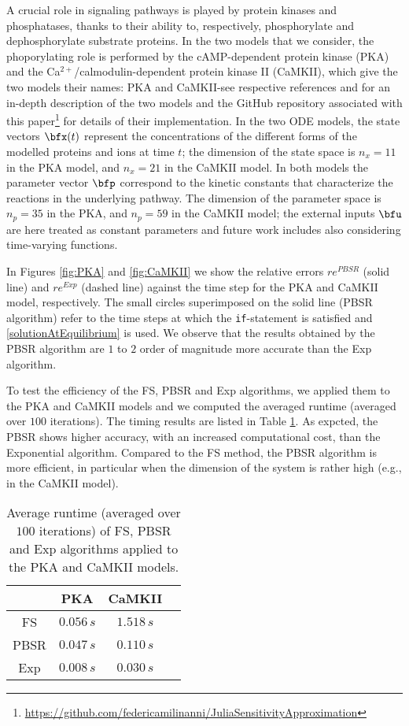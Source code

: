 \documentclass[DIV=12]{scrartcl} %
\newcommand{\rerr}{\ensuremath{re}}
\theoremstyle{definition}
\begin{document}
A crucial role in signaling pathways is played by protein kinases and phosphatases, thanks to their ability to, respectively, phosphorylate and dephosphorylate substrate proteins. In the two models that we consider, the phoporylating role is performed by the cAMP-dependent protein kinase (PKA) and the Ca$^{2+}$/calmodulin-dependent protein kinase II (CaMKII), which give the two models their names: PKA and CaMKII-see respective references \cite{Church2021.03.14.435320} and \cite{NAIR2014277, Eriksson19} for an in-depth description of the two models and the GitHub repository associated with this paper\footnote{\url{https://github.com/federicamilinanni/JuliaSensitivityApproximation}} for details of their implementation. In the two ODE models, the state vectors $\bfx(t)$ represent the concentrations of the different forms of the modelled proteins and ions at time $t$; the dimension of the state space is $n_x=11$ in the PKA model, and $n_x=21$ in the CaMKII model. In both models the parameter vector $\bfp$ correspond to the kinetic constants that characterize the reactions in the underlying pathway. The dimension of the parameter space is $n_p=35$ in the PKA, and $n_p=59$ in the CaMKII model; the external inputs $\bfu$ are here treated as constant parameters and future work includes also considering time-varying functions.

In Figures \ref{fig:PKA} and \ref{fig:CaMKII} we show the relative errors $\rerr^{PBSR}$ (solid line) and $\rerr^{Exp}$ (dashed line) against the time step for the PKA and CaMKII model, respectively. The small circles superimposed on the solid line (PBSR algorithm) refer to the time steps at which the \texttt{if}-statement is satisfied and \eqref{solutionAtEquilibrium} is used. We observe that the results obtained by the PBSR algorithm are $1$ to $2$ order of magnitude more accurate than the Exp algorithm. 

To test the efficiency of the FS, PBSR and Exp algorithms, we applied them to the PKA and CaMKII models and we computed the averaged runtime (averaged over $100$ iterations). The timing results are listed in Table \ref{tab:timingPKACaMKII}. As expcted, the PBSR shows higher accuracy, with an increased computational cost, than the Exponential algorithm. Compared to the FS method, the PBSR algorithm is more efficient, in particular when the dimension of the system is rather high (e.g., in the CaMKII model). 

\begin{table}
\centering
\begin{tabular}{ c | c c c }
  & PKA & CaMKII \\ 
  \hline
 FS & $0.056\,s$ & $1.518\,s$ \\  
 PBSR & $0.047\,s$ & $0.110\,s$ \\
 Exp & $0.008\,s$ & $0.030\,s$
\end{tabular}
\caption{Average runtime (averaged over $100$ iterations) of FS, PBSR and Exp algorithms applied to the PKA and CaMKII models.}
\label{tab:timingPKACaMKII}
\end{table}
\end{document}
